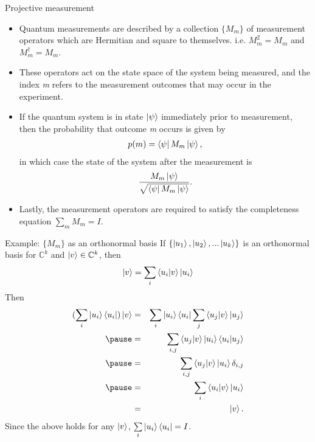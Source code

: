 \documentclass[handout, 10 pt]{beamer}
\begin{document}
\begin{frame}{Projective measurement}
\begin{itemize}
    \item Quantum measurements are described by a collection $\{M_m\}$ of measurement operators which are Hermitian and square to themselves. i.e. $M_m^2=M_m$ and $M_m^\dagger=M_m$.
    \pause
    \item These operators act on the state space of the system being measured, and the index {\emph{m}} refers to the measurement outcomes that may occur in the experiment. 
    \pause
    \item If the quantum system is in state $\ket{\psi}$ immediately prior to measurement, then the probability that outcome {\emph{m}} occurs is given by 
    \begin{gather*}
       p(m)=\bra{\psi}M_m \ket{\psi},
    \end{gather*}
    in which case the state of the system after the measurement is
    \begin{gather*}
        \frac{M_m \ket{\psi}}{\sqrt{\bra{\psi}M_m \ket{\psi}}}.
    \end{gather*}
    \pause
    \item Lastly, the measurement operators are required to satisfy the completeness equation $\sum\limits_m M_m =I$.   
\end{itemize}
\end{frame}



\begin{frame}{Example: $\{M_m\}$ as an orthonormal basis }
 If $\{\ket{u_1}, \ket{u_2}, ...\ket{u_k}\}$ is an orthonormal basis for ${\mathbb{C}}^k$ and $\ket{v} \in {\mathbb{C}}^k$, then
$$\ket{v}=\sum\limits_i\braket{u_i|v}\ket{u_i}$$
\pause
Then
\begin{eqnarray*}
    (\sum_i \ket{u_i}\bra{u_i})\ket{v}&=&
    \sum_i \ket{u_i}\bra{u_i}\sum_j \braket{u_j|v} \ket{u_j}\\
    \pause
    &=& \sum_{i,j}\braket{u_j|v}\ket{u_i}\braket{u_i|u_j}\\
    \pause
    &=& \sum_{i,j}\braket{u_j|v}\ket{u_i}\delta_{i,j}\\
    \pause
    &=&\sum_i \braket{u_i|v}\ket{u_i}\\
    &=&\ket{v}.
\end{eqnarray*}
\pause
Since the above holds for any $\ket{v}$, $\sum\limits_i \ket{u_i}\bra{u_i}=I$.   
\end{frame}
\end{document}
